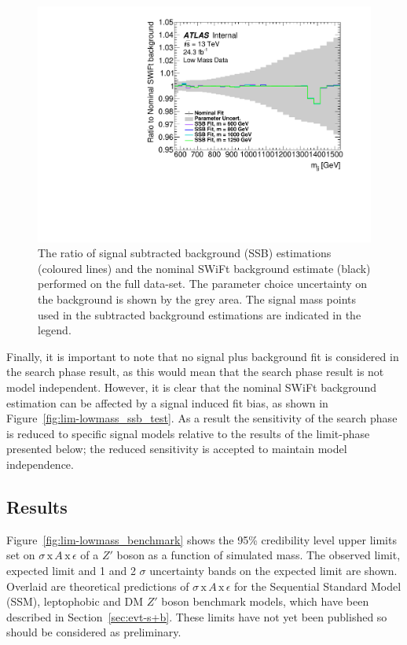 \begin{figure}[!ht]
  \begin{center}
    \includegraphics[width=0.6\linewidth, angle=0]{figs/Dibjet/LowMass/lim-ssb_data.pdf}
  \end{center}
  \vspace{-1mm}
  \caption[The ratio of signal subtracted background estimations
    and the SWiFt background estimate performed on the full \lm{} data-set.]
          {The ratio of signal subtracted background (SSB) estimations (coloured lines)
    and the nominal SWiFt background estimate (black) performed on the full \lm{} data-set.
    The parameter choice uncertainty on the background is shown by the grey area.
    The signal mass points used in the subtracted background estimations are indicated in the legend.}
  \label{fig:lim-lowmass_ssb_data}
\end{figure}

Finally, it is important to note that no signal plus background fit is considered in the search phase result,
as this would mean that the search phase result is not model independent.
However, it is clear that the nominal SWiFt background estimation can be affected by a signal induced fit bias,
as shown in Figure~\ref{fig:lim-lowmass_ssb_test}.
As a result the sensitivity of the search phase is reduced to specific signal models relative to the results of the limit-phase presented below;
the reduced sensitivity is accepted to maintain model independence.

\subsection{Results}
\label{sec:lim-full_results}

Figure~\ref{fig:lim-lowmass_benchmark} shows the
95\% credibility level upper limits set on $\sigma\,\text{x}\,\mathit{A}\,\text{x}\,\epsilon$
of a $Z'$ boson as a function of simulated mass.
The observed limit, expected limit and 1 and 2 $\sigma$ uncertainty bands on the expected limit are shown.
Overlaid are theoretical predictions of $\sigma\,\text{x}\,\mathit{A}\,\text{x}\,\epsilon$ for the
Sequential Standard Model (SSM), leptophobic and DM $Z'$ boson benchmark models, which have been described in Section~\ref{sec:evt-s+b}.
These limits have not yet been published so should be considered as preliminary.

